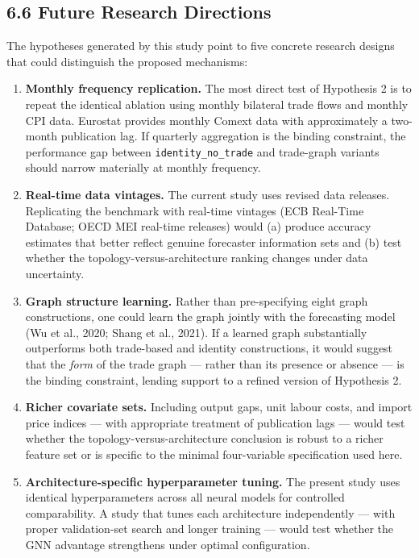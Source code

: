 \documentclass[
]{article}
\providecommand{\tightlist}{%
  \setlength{\itemsep}{0pt}\setlength{\parskip}{0pt}}
\begin{document}
\subsection{6.6 Future Research Directions}\label{future-research-directions}

The hypotheses generated by this study point to five concrete research designs that could distinguish the proposed mechanisms:

\begin{enumerate}
\def\labelenumi{\arabic{enumi}.}
\tightlist
\item
  \textbf{Monthly frequency replication.} The most direct test of Hypothesis 2 is to repeat the identical ablation using monthly bilateral trade flows and monthly CPI data. Eurostat provides monthly Comext data with approximately a two-month publication lag. If quarterly aggregation is the binding constraint, the performance gap between \texttt{identity\_no\_trade} and trade-graph variants should narrow materially at monthly frequency.
\item
  \textbf{Real-time data vintages.} The current study uses revised data releases. Replicating the benchmark with real-time vintages (ECB Real-Time Database; OECD MEI real-time releases) would (a) produce accuracy estimates that better reflect genuine forecaster information sets and (b) test whether the topology-versus-architecture ranking changes under data uncertainty.
\item
  \textbf{Graph structure learning.} Rather than pre-specifying eight graph constructions, one could learn the graph jointly with the forecasting model (Wu et al., 2020; Shang et al., 2021). If a learned graph substantially outperforms both trade-based and identity constructions, it would suggest that the \emph{form} of the trade graph — rather than its presence or absence — is the binding constraint, lending support to a refined version of Hypothesis 2.
\item
  \textbf{Richer covariate sets.} Including output gaps, unit labour costs, and import price indices — with appropriate treatment of publication lags — would test whether the topology-versus-architecture conclusion is robust to a richer feature set or is specific to the minimal four-variable specification used here.
\item
  \textbf{Architecture-specific hyperparameter tuning.} The present study uses identical hyperparameters across all neural models for controlled comparability. A study that tunes each architecture independently — with proper validation-set search and longer training — would test whether the GNN advantage strengthens under optimal configuration.
\end{enumerate}
\end{document}
